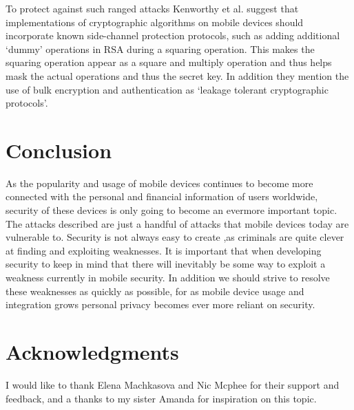 \documentclass{sig-alternate}
\begin{document}
 To protect against such ranged attacks Kenworthy et al. suggest that implementations of cryptographic algorithms on mobile devices should incorporate known side-channel protection protocols, such as adding additional `dummy' operations in RSA during a squaring operation. This makes the squaring operation appear as a square and multiply operation and thus helps mask the actual operations and thus the secret key. In addition they mention the use of bulk encryption and authentication as `leakage tolerant cryptographic protocols'.      
\section{Conclusion}
As the popularity and usage of mobile devices continues to become more connected with the personal and financial information of users worldwide, security of these devices is only going to become an evermore important topic. The attacks described are just a handful of attacks that mobile devices today are vulnerable to. Security is not always easy to create ,as criminals are quite clever at finding and exploiting weaknesses. It is important that when developing security to keep in mind that there will inevitably be some way to exploit a weakness currently in mobile security. In addition we should strive to resolve these weaknesses as quickly as possible, for as mobile device usage and integration grows personal privacy becomes ever more reliant on security.     

\section{Acknowledgments}
	I would like to thank Elena Machkasova and Nic Mcphee for their support and feedback, and a thanks to my sister Amanda for inspiration on this topic.

 

\end{document}
